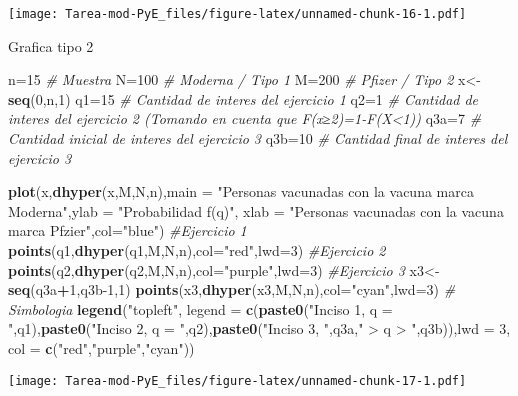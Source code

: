 \documentclass[
]{article}
\newenvironment{Shaded}{\begin{snugshade}}{\end{snugshade}}
\newcommand{\AttributeTok}[1]{\textcolor[rgb]{0.13,0.29,0.53}{#1}}
\newcommand{\CommentTok}[1]{\textcolor[rgb]{0.56,0.35,0.01}{\textit{#1}}}
\newcommand{\DecValTok}[1]{\textcolor[rgb]{0.00,0.00,0.81}{#1}}
\newcommand{\FunctionTok}[1]{\textcolor[rgb]{0.13,0.29,0.53}{\textbf{#1}}}
\newcommand{\NormalTok}[1]{#1}
\newcommand{\OtherTok}[1]{\textcolor[rgb]{0.56,0.35,0.01}{#1}}
\newcommand{\SpecialCharTok}[1]{\textcolor[rgb]{0.81,0.36,0.00}{\textbf{#1}}}
\newcommand{\StringTok}[1]{\textcolor[rgb]{0.31,0.60,0.02}{#1}}
\begin{document}
\texttt{[image: Tarea-mod-PyE\_files/figure-latex/unnamed-chunk-16-1.pdf]}

Grafica tipo 2

\begin{Shaded}
\begin{Highlighting}[]
\NormalTok{n}\OtherTok{=}\DecValTok{15} \CommentTok{\# Muestra}
\NormalTok{N}\OtherTok{=}\DecValTok{100} \CommentTok{\# Moderna / Tipo 1}
\NormalTok{M}\OtherTok{=}\DecValTok{200} \CommentTok{\# Pfizer / Tipo 2}
\NormalTok{x}\OtherTok{\textless{}{-}}\FunctionTok{seq}\NormalTok{(}\DecValTok{0}\NormalTok{,n,}\DecValTok{1}\NormalTok{)}
\NormalTok{q1}\OtherTok{=}\DecValTok{15} \CommentTok{\# Cantidad de interes del ejercicio 1}
\NormalTok{q2}\OtherTok{=}\DecValTok{1} \CommentTok{\# Cantidad de interes del ejercicio 2 (Tomando en cuenta que F(x≥2)=1{-}F(X\textless{}1))}
\NormalTok{q3a}\OtherTok{=}\DecValTok{7} \CommentTok{\# Cantidad inicial de interes del ejercicio 3}
\NormalTok{q3b}\OtherTok{=}\DecValTok{10} \CommentTok{\# Cantidad final de interes del ejercicio 3}

\FunctionTok{plot}\NormalTok{(x,}\FunctionTok{dhyper}\NormalTok{(x,M,N,n),}\AttributeTok{main =} \StringTok{"Personas vacunadas con la vacuna marca Moderna"}\NormalTok{,}\AttributeTok{ylab =} \StringTok{"Probabilidad f(q)"}\NormalTok{, }\AttributeTok{xlab =} \StringTok{"Personas vacunadas con la vacuna marca Pfzier"}\NormalTok{,}\AttributeTok{col=}\StringTok{"blue"}\NormalTok{)}
\CommentTok{\#Ejercicio 1}
\FunctionTok{points}\NormalTok{(q1,}\FunctionTok{dhyper}\NormalTok{(q1,M,N,n),}\AttributeTok{col=}\StringTok{"red"}\NormalTok{,}\AttributeTok{lwd=}\DecValTok{3}\NormalTok{)}
\CommentTok{\#Ejercicio 2}
\FunctionTok{points}\NormalTok{(q2,}\FunctionTok{dhyper}\NormalTok{(q2,M,N,n),}\AttributeTok{col=}\StringTok{"purple"}\NormalTok{,}\AttributeTok{lwd=}\DecValTok{3}\NormalTok{)}
\CommentTok{\#Ejercicio 3}
\NormalTok{x3}\OtherTok{\textless{}{-}}\FunctionTok{seq}\NormalTok{(q3a}\SpecialCharTok{+}\DecValTok{1}\NormalTok{,q3b}\DecValTok{{-}1}\NormalTok{,}\DecValTok{1}\NormalTok{)}
\FunctionTok{points}\NormalTok{(x3,}\FunctionTok{dhyper}\NormalTok{(x3,M,N,n),}\AttributeTok{col=}\StringTok{"cyan"}\NormalTok{,}\AttributeTok{lwd=}\DecValTok{3}\NormalTok{)}
\CommentTok{\# Simbologia}
\FunctionTok{legend}\NormalTok{(}\StringTok{"topleft"}\NormalTok{, }\AttributeTok{legend =} \FunctionTok{c}\NormalTok{(}\FunctionTok{paste0}\NormalTok{(}\StringTok{"Inciso 1, q = "}\NormalTok{,q1),}\FunctionTok{paste0}\NormalTok{(}\StringTok{"Inciso 2, q = "}\NormalTok{,q2),}\FunctionTok{paste0}\NormalTok{(}\StringTok{"Inciso 3, "}\NormalTok{,q3a,}\StringTok{" \textgreater{} q \textgreater{} "}\NormalTok{,q3b)),}\AttributeTok{lwd =} \DecValTok{3}\NormalTok{, }\AttributeTok{col =} \FunctionTok{c}\NormalTok{(}\StringTok{"red"}\NormalTok{,}\StringTok{"purple"}\NormalTok{,}\StringTok{"cyan"}\NormalTok{))}
\end{Highlighting}
\end{Shaded}

\texttt{[image: Tarea-mod-PyE\_files/figure-latex/unnamed-chunk-17-1.pdf]}
\end{document}
